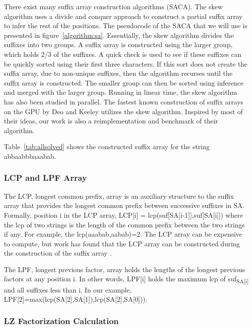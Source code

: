 There exist many suffix array construction algorithms (SACA).
The skew algorithm \cite{karkkainen2003simple} uses a divide and conquer approach to construct a partial suffix array to infer the rest of the positions.
The pseudocode of the SACA that we will use is presented in figure~\ref{algorithm:sa}.
Essentially, the skew algorithm divides the suffixes into two groups.
A suffix array is constructed using the larger group, which holds 2/3 of the suffixes.
A quick check is used to see if these suffixes can be quickly sorted using their first three characters.
If this sort does not create the suffix array, due to non-unique suffixes, then the algorithm recurses until the suffix array is constructed.
The smaller group can then be sorted using inference and merged with the larger group.
Running in linear time, the skew algorithm has also been studied in parallel.
The fastest known construction of suffix arrays on the GPU by Deo and Keeley \cite{Deo} utilizes the skew algorithm.
Inspired by most of their ideas, our work is also a reimplementation and benchmark of their algorithm.

Table~\ref{tab:allsolved} shows the constructed suffix array for the string abbaabbbaaabab.

\subsubsection{LCP and LPF Array}

The LCP, longest common prefix, array is an auxiliary structure to the suffix array that provides the longest common prefix between successive suffixes in SA.
Formally, position i in the LCP array, LCP[i] = lcp(suf[SA[i-1]],suf[SA[i]]) where the lcp of two strings is the length of the common prefix between the two strings if any.
For example, the lcp(aaabab,aabab)=2.
The LCP array can be expensive to compute, but work has found that the LCP array can be constructed during the construction of the suffix array \cite{lcp}.

The LPF, longest previous factor, array holds the lengths of the longest previous factors at any position i.
In other words, LPF[i] holds the maximum lcp of suf\textsubscript{SA[i]} and all suffixes less than i.
In our example, LPF[2]=max(lcp(SA[2],SA[1]),lcp(SA[2],SA[0])).

\subsubsection{LZ Factorization Calculation}

